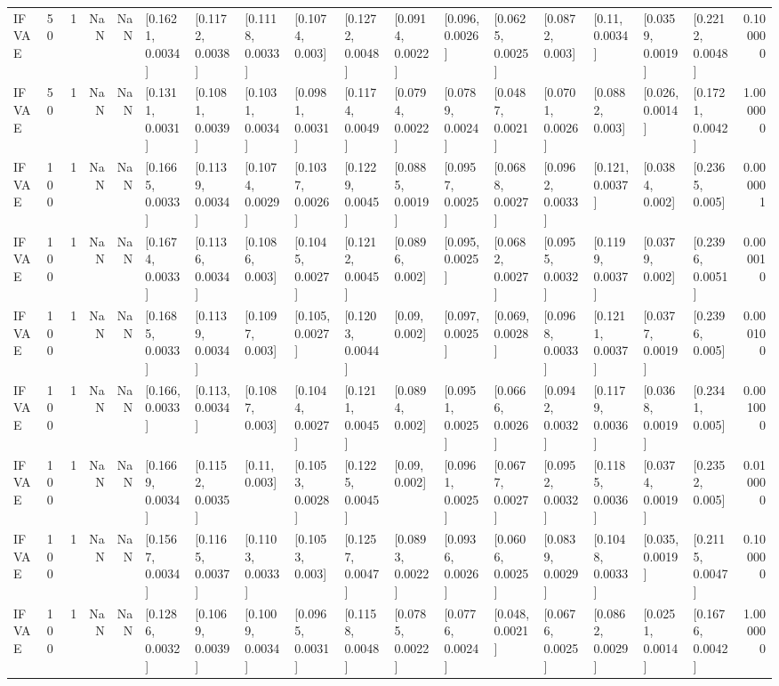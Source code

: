 \begin{tabular}{lllrrllllllllllllr}
   IFVAE &   50 &     1 &   NaN &   NaN &  [0.1621, 0.0034] &  [0.1172, 0.0038] &  [0.1118, 0.0033] &   [0.1074, 0.003] &  [0.1272, 0.0048] &  [0.0914, 0.0022] &   [0.096, 0.0026] &  [0.0625, 0.0025] &   [0.0872, 0.003] &    [0.11, 0.0034] &  [0.0359, 0.0019] &  [0.2212, 0.0048] &  0.100000 \\
   IFVAE &   50 &     1 &   NaN &   NaN &  [0.1311, 0.0031] &  [0.1081, 0.0039] &  [0.1031, 0.0034] &  [0.0981, 0.0031] &  [0.1174, 0.0049] &  [0.0794, 0.0022] &  [0.0789, 0.0024] &  [0.0487, 0.0021] &  [0.0701, 0.0026] &   [0.0882, 0.003] &   [0.026, 0.0014] &  [0.1721, 0.0042] &  1.000000 \\
   IFVAE &  100 &     1 &   NaN &   NaN &  [0.1665, 0.0033] &  [0.1139, 0.0034] &  [0.1074, 0.0029] &  [0.1037, 0.0026] &  [0.1229, 0.0045] &  [0.0885, 0.0019] &  [0.0957, 0.0025] &  [0.0688, 0.0027] &  [0.0962, 0.0033] &   [0.121, 0.0037] &   [0.0384, 0.002] &   [0.2365, 0.005] &  0.000001 \\
   IFVAE &  100 &     1 &   NaN &   NaN &  [0.1674, 0.0033] &  [0.1136, 0.0034] &   [0.1086, 0.003] &  [0.1045, 0.0027] &  [0.1212, 0.0045] &   [0.0896, 0.002] &   [0.095, 0.0025] &  [0.0682, 0.0027] &  [0.0955, 0.0032] &  [0.1199, 0.0037] &   [0.0379, 0.002] &  [0.2396, 0.0051] &  0.000010 \\
   IFVAE &  100 &     1 &   NaN &   NaN &  [0.1685, 0.0033] &  [0.1139, 0.0034] &   [0.1097, 0.003] &   [0.105, 0.0027] &  [0.1203, 0.0044] &     [0.09, 0.002] &   [0.097, 0.0025] &   [0.069, 0.0028] &  [0.0968, 0.0033] &  [0.1211, 0.0037] &  [0.0377, 0.0019] &   [0.2396, 0.005] &  0.000100 \\
   IFVAE &  100 &     1 &   NaN &   NaN &   [0.166, 0.0033] &   [0.113, 0.0034] &   [0.1087, 0.003] &  [0.1044, 0.0027] &  [0.1211, 0.0045] &   [0.0894, 0.002] &  [0.0951, 0.0025] &  [0.0666, 0.0026] &  [0.0942, 0.0032] &  [0.1179, 0.0036] &  [0.0368, 0.0019] &   [0.2341, 0.005] &  0.001000 \\
   IFVAE &  100 &     1 &   NaN &   NaN &  [0.1669, 0.0034] &  [0.1152, 0.0035] &     [0.11, 0.003] &  [0.1053, 0.0028] &  [0.1225, 0.0045] &     [0.09, 0.002] &  [0.0961, 0.0025] &  [0.0677, 0.0027] &  [0.0952, 0.0032] &  [0.1185, 0.0036] &  [0.0374, 0.0019] &   [0.2352, 0.005] &  0.010000 \\
   IFVAE &  100 &     1 &   NaN &   NaN &  [0.1567, 0.0034] &  [0.1165, 0.0037] &  [0.1103, 0.0033] &   [0.1053, 0.003] &  [0.1257, 0.0047] &  [0.0893, 0.0022] &  [0.0936, 0.0026] &  [0.0606, 0.0025] &  [0.0839, 0.0029] &  [0.1048, 0.0033] &   [0.035, 0.0019] &  [0.2115, 0.0047] &  0.100000 \\
   IFVAE &  100 &     1 &   NaN &   NaN &  [0.1286, 0.0032] &  [0.1069, 0.0039] &  [0.1009, 0.0034] &  [0.0965, 0.0031] &  [0.1158, 0.0048] &  [0.0785, 0.0022] &  [0.0776, 0.0024] &   [0.048, 0.0021] &  [0.0676, 0.0025] &  [0.0862, 0.0029] &  [0.0251, 0.0014] &  [0.1676, 0.0042] &  1.000000 \\
\bottomrule
\end{tabular}
